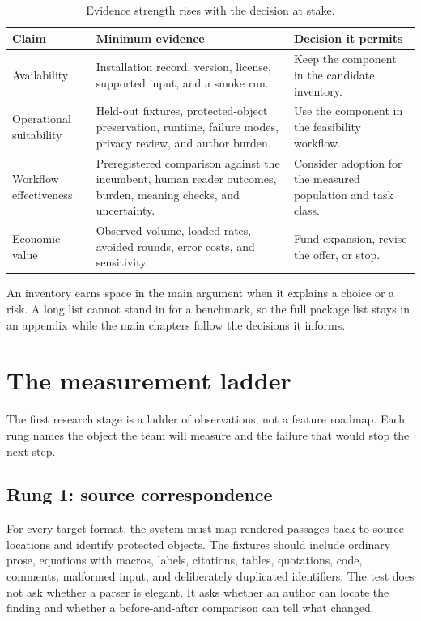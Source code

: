 \begin{table}[H]
\centering
\small
\begin{tabularx}{\textwidth}{@{}p{}L p{0.25\textwidth}@{}}
\toprule
Claim & Minimum evidence & Decision it permits \\
\midrule
Availability & Installation record, version, license, supported input, and a
smoke run. & Keep the component in the candidate inventory. \\
Operational suitability & Held-out fixtures, protected-object preservation,
runtime, failure modes, privacy review, and author burden. & Use the component
in the feasibility workflow. \\
Workflow effectiveness & Preregistered comparison against the incumbent,
human reader outcomes, burden, meaning checks, and uncertainty. & Consider
adoption for the measured population and task class. \\
Economic value & Observed volume, loaded rates, avoided rounds, error costs,
and sensitivity. & Fund expansion, revise the offer, or stop. \\
\bottomrule
\end{tabularx}
\caption{Evidence strength rises with the decision at stake.}
\label{tab:research-claim-ladder}
\end{table}

An inventory earns space in the main argument when it explains a choice or a
risk. A long list cannot stand in for a benchmark, so the full package list
stays in an appendix while the main chapters follow the decisions it informs.

\section{The measurement ladder}

The first research stage is a ladder of observations, not a feature roadmap.
Each rung names the object the team will measure and the failure that would
stop the next step.

\subsection{Rung 1: source correspondence}

For every target format, the system must map rendered passages back to source
locations and identify protected objects. The fixtures should include ordinary
prose, equations with macros, labels, citations, tables, quotations, code,
comments, malformed input, and deliberately duplicated identifiers. The test
does not ask whether a parser is elegant. It asks whether an author can locate
the finding and whether a before-and-after comparison can tell what changed.

